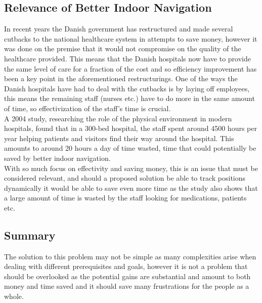 \subsection{Relevance of Better Indoor Navigation}
In recent years the Danish government has restructured and made several cutbacks to the national healthcare system in attempts to save money\cite{cutback_danNHS}, however it was done on the premise that it would not compromise on the quality of the healthcare provided. This means that the Danish hospitals now have to provide the same level of care for a fraction of the cost and so efficiency improvement has been a key point in the aforementioned restructurings. One of the ways the Danish hospitals have had to deal with the cutbacks is by laying off employees\cite{cutback_firing}, this means the remaining staff (nurses etc.) have to do more in the same amount of time, so effectivization of the staff's time is crucial.\\
A 2004 study\cite{twaste_2004}, researching the role of the physical environment in modern hospitals, found that in a 300-bed hospital, the staff spent around 4500 hours per year helping patients and visitors find their way around the hospital. This amounts to around 20 hours a day of time wasted, time that could potentially be saved by better indoor navigation.\\
With so much focus on effectivity and saving money, this is an issue that must be considered relevant, and should a proposed solution be able to track positions dynamically it would be able to save even more time as the study also shows that a large amount of time is wasted by the staff looking for medications, patients etc.

\subsection{Summary}
The solution to this problem may not be simple as many complexities arise when dealing with different prerequisites and goals, however it is not a problem that should be overlooked as the potential gains are substantial and amount to both money and time saved and it should save many frustrations for the people as a whole.